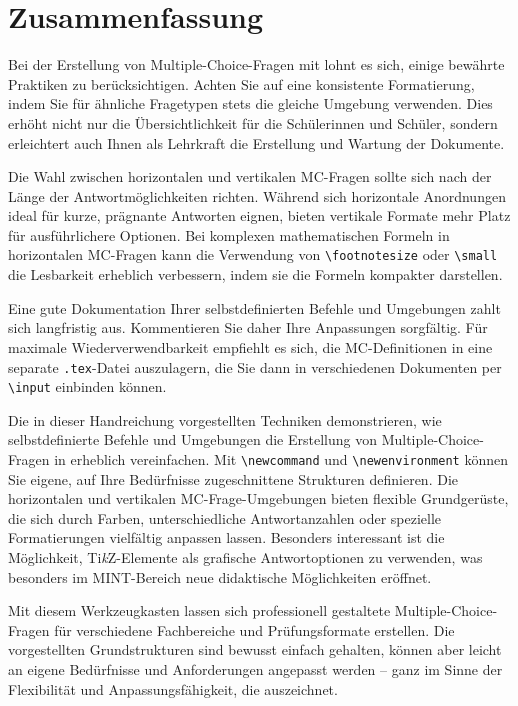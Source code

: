 \section{Zusammenfassung}

Bei der Erstellung von Multiple-Choice-Fragen mit  lohnt es sich, einige bewährte Praktiken zu berücksichtigen. Achten Sie auf eine konsistente Formatierung, indem Sie für ähnliche Fragetypen stets die gleiche Umgebung verwenden. Dies erhöht nicht nur die Übersichtlichkeit für die Schülerinnen und Schüler, sondern erleichtert auch Ihnen als Lehrkraft die Erstellung und Wartung der Dokumente.

Die Wahl zwischen horizontalen und vertikalen MC-Fragen sollte sich nach der Länge der Antwortmöglichkeiten richten. Während sich horizontale Anordnungen ideal für kurze, prägnante Antworten eignen, bieten vertikale Formate mehr Platz für ausführlichere Optionen. Bei komplexen mathematischen Formeln in horizontalen MC-Fragen kann die Verwendung von \texttt{\textbackslash footnotesize} oder \texttt{\textbackslash small} die Lesbarkeit erheblich verbessern, indem sie die Formeln kompakter darstellen.

Eine gute Dokumentation Ihrer selbstdefinierten Befehle und Umgebungen zahlt sich langfristig aus. Kommentieren Sie daher Ihre Anpassungen sorgfältig. Für maximale Wiederverwendbarkeit empfiehlt es sich, die MC-Definitionen in eine separate \texttt{.tex}-Datei auszulagern, die Sie dann in verschiedenen Dokumenten per \texttt{\textbackslash input} einbinden können.

Die in dieser Handreichung vorgestellten Techniken demonstrieren, wie selbstdefinierte Befehle und Umgebungen die Erstellung von Multiple-Choice-Fragen in  erheblich vereinfachen. Mit \texttt{\textbackslash newcommand} und \texttt{\textbackslash newenvironment} können Sie eigene, auf Ihre Bedürfnisse zugeschnittene Strukturen definieren. Die horizontalen und vertikalen MC-Frage-Umgebungen bieten flexible Grundgerüste, die sich durch Farben, unterschiedliche Antwortanzahlen oder spezielle Formatierungen vielfältig anpassen lassen. Besonders interessant ist die Möglichkeit, Ti\textit{k}Z-Elemente als grafische Antwortoptionen zu verwenden, was besonders im MINT-Bereich neue didaktische Möglichkeiten eröffnet.

Mit diesem Werkzeugkasten lassen sich professionell gestaltete Multiple-Choice-Fragen für verschiedene Fachbereiche und Prüfungsformate erstellen. Die vorgestellten Grundstrukturen sind bewusst einfach gehalten, können aber leicht an eigene Bedürfnisse und Anforderungen angepasst werden – ganz im Sinne der Flexibilität und Anpassungsfähigkeit, die  auszeichnet.

